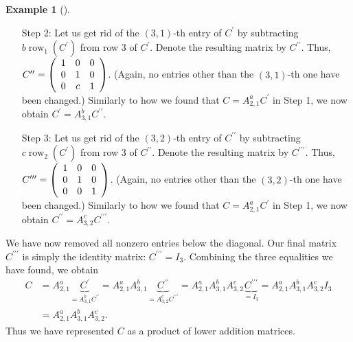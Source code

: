 \documentclass[numbers=enddot,12pt,final,onecolumn,notitlepage]{scrartcl}%
\theoremstyle{definition}
\newtheorem{exam}[theo]{Example}
\newenvironment{example}[1][]
{\begin{exam}[#1]\begin{leftbar}}
{\end{leftbar}\end{exam}}
\begin{document}
\begin{example}
\begin{enumerate}
\item[Step 2:] Let us get rid of the $\left(  3,1\right)  $-th entry of
$C^{\prime}$ by subtracting $b\operatorname*{row}\nolimits_{1}\left(
C^{\prime}\right)  $ from row $3$ of $C^{\prime}$. Denote the resulting matrix
by $C^{\prime\prime}$. Thus, $C^{\prime\prime}=\left(
\begin{array}
[c]{ccc}%
1 & 0 & 0\\
0 & 1 & 0\\
0 & c & 1
\end{array}
\right)  $. (Again, no entries other than the $\left(  3,1\right)  $-th one
have been changed.) Similarly to how we found that $C=A_{2,1}^{a}C^{\prime}$
in Step 1, we now obtain $C^{\prime}=A_{3,1}^{b}C^{\prime\prime}$.

\item[Step 3:] Let us get rid of the $\left(  3,2\right)  $-th entry of
$C^{\prime\prime}$ by subtracting $c\operatorname*{row}\nolimits_{2}\left(
C^{\prime}\right)  $ from row $3$ of $C^{\prime\prime}$. Denote the resulting
matrix by $C^{\prime\prime\prime}$. Thus, $C^{\prime\prime\prime}=\left(
\begin{array}
[c]{ccc}%
1 & 0 & 0\\
0 & 1 & 0\\
0 & 0 & 1
\end{array}
\right)  $. (Again, no entries other than the $\left(  3,2\right)  $-th one
have been changed.) Similarly to how we found that $C=A_{2,1}^{a}C^{\prime}$
in Step 1, we now obtain $C^{\prime\prime}=A_{3,2}^{c}C^{\prime\prime\prime}$.
\end{enumerate}

We have now removed all nonzero entries below the diagonal. Our final matrix
$C^{\prime\prime\prime}$ is simply the identity matrix: $C^{\prime\prime
\prime}=I_{3}$. Combining the three equalities we have found, we obtain%
\begin{align*}
C  & =A_{2,1}^{a}\underbrace{C^{\prime}}_{=A_{3,1}^{b}C^{\prime\prime}%
}=A_{2,1}^{a}A_{3,1}^{b}\underbrace{C^{\prime\prime}}_{=A_{3,2}^{c}%
C^{\prime\prime\prime}}=A_{2,1}^{a}A_{3,1}^{b}A_{3,2}^{c}\underbrace{C^{\prime
\prime\prime}}_{=I_{3}}=A_{2,1}^{a}A_{3,1}^{b}A_{3,2}^{c}I_{3}\\
& =A_{2,1}^{a}A_{3,1}^{b}A_{3,2}^{c}.
\end{align*}
Thus we have represented $C$ as a product of lower addition matrices.


\end{example}
\end{document}
